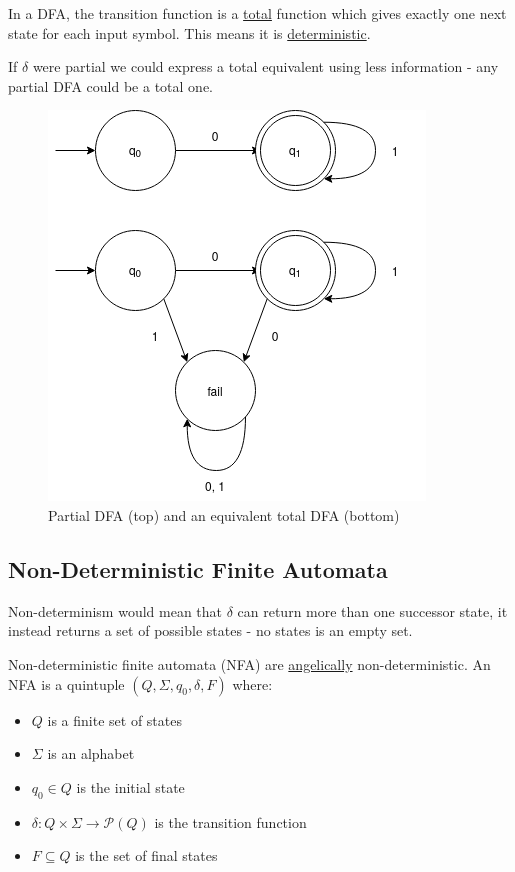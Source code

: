 \documentclass{article}
\begin{document}
In a DFA, the transition function is a \hyperref[total-partial]{total} function which gives exactly one next state for each input symbol. This means it is \hyperref[deterministic]{deterministic}.

If $\delta$ were partial we could express a total equivalent using less information - any partial DFA could be a total one.

\begin{figure}[H]
    \centering
    \includegraphics[scale=0.5]{images/partial-dfa.png}
    \caption{Partial DFA (top) and an equivalent total DFA (bottom)}
    \label{fig:partial-dfa}
\end{figure}

\subsection{Non-Deterministic Finite Automata}\label{nfa}
Non-determinism would mean that $\delta$ can return more than one successor state, it instead returns a set of possible states - no states is an empty set.

Non-deterministic finite automata (NFA) are \hyperref[angel-devil]{angelically} non-deterministic. An NFA is a quintuple $(Q, \Sigma, q_0, \delta, F)$ where:
\begin{itemize}
    \item $Q$ is a finite set of states
    \item $\Sigma$ is an alphabet
    \item $q_0 \in Q$ is the initial state
    \item $\delta : Q \times \Sigma \to \mathcal{P}(Q)$ is the transition function
    \item $F \subseteq Q$ is the set of final states
\end{itemize}
\end{document}
